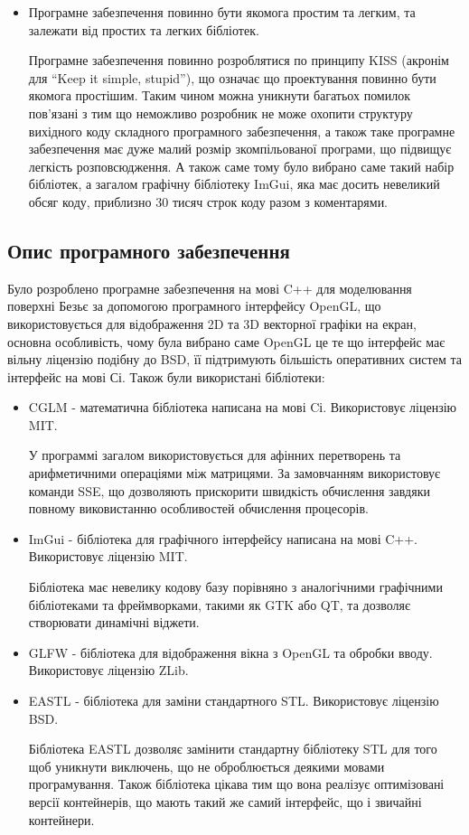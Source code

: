 \let\mypdfximage\pdfximage\def\pdfximage{\immediate\mypdfximage}\documentclass[14pt,a4paper]{extarticle}
\theoremstyle{definition}
\renewcommand{\[}{\begin{singlespace}\begin{equation*}}
\renewcommand{\]}{\end{equation*}\end{singlespace}}
\renewcommand{\+}{\discretionary{\mbox{\scriptsize$\hookleftarrow$}}{}{}}
\begin{document}
\begin{itemize}
\item Програмне забезпечення повинно бути якомога простим та легким, та залежати від простих та легких бібліотек.

Програмне забезпечення повинно розроблятися по принципу KISS (акронім для ``Keep it simple, stupid''), що означає що проектування повинно бути якомога простішим. Таким чином можна уникнути багатьох помилок пов'язані з тим що неможливо розробник не може охопити структуру вихідного коду складного програмного забезпечення, а також таке програмне забезпечення має дуже малий розмір зкомпільованої програми, що підвищує легкість розповсюдження.  А також саме тому було вибрано саме такий набір бібліотек, а загалом графічну бібліотеку ImGui, яка має досить невеликий обсяг коду, приблизно 30 тисяч строк коду разом з коментарями.
\end{itemize}


\subsection{Опис програмного забезпечення}

Було розроблено програмне забезпечення на мові C++ для моделювання поверхні Безьє за допомогою програмного інтерфейсу OpenGL, що використовується для відображення 2D та 3D векторної графіки на екран, основна особливість, чому була вибрано саме OpenGL це те що інтерфейс має вільну ліцензію подібну до BSD, її підтримують більшість оперативних систем та інтерфейс на мові Сі. Також були використані бібліотеки:

\begin{itemize}
\item CGLM - математична бібліотека написана на мові Cі. Використовує ліцензію MIT.

У программі загалом використовується для афінних перетворень та арифметичними операціями між матрицями. За замовчанням використовує команди SSE, що дозволяють прискорити швидкість обчислення завдяки повному виковистанню особливостей обчислення процесорів.

\item ImGui - бібліотека для графічного інтерфейсу написана на мові C++. Використовує ліцензію MIT.

Бібліотека має невелику кодову базу порівняно з аналогічними графічними бібліотеками та фреймворками, такими як GTK або QT, та дозволяє створювати динамічні віджети.

\item GLFW - бібліотека для відображення вікна з OpenGL та обробки вводу. Використовує ліцензію ZLib.

\item EASTL - бібліотека для заміни стандартного STL. Використовує ліцензію BSD.

Бібліотека EASTL дозволяє замінити стандартну бібліотеку STL для того щоб уникнути виключень, що не оброблюється деякими мовами програмування. Також бібліотека цікава тим що вона реалізує оптимізовані версії контейнерів, що мають такий же самий інтерфейс, що і звичайні контейнери.
\end{itemize}
\end{document}
